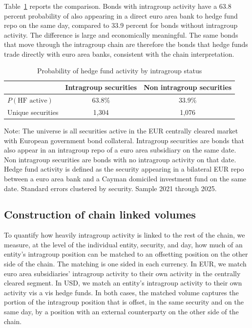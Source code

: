 \documentclass[english, 11pt, oneside, legal]{article}
\begin{document}
Table~\ref{tab:hf_link} reports the comparison. Bonds with intragroup activity have a 63.8 percent probability of also appearing in a direct euro area bank to hedge fund repo on the same day, compared to 33.9 percent for bonds without intragroup activity. The difference is large and economically meaningful. The same bonds that move through the intragroup chain are therefore the bonds that hedge funds trade directly with euro area banks, consistent with the chain interpretation.

\begin{table}[t]
    \centering
    \caption{Probability of hedge fund activity by intragroup status}
    \label{tab:hf_link}
    \begin{tabular}{lcc}
        \hline
                                    & Intragroup securities & Non intragroup securities \\
        \hline
        $P(\text{HF active})$       & 63.8\%           & 33.9\%               \\
        Unique securities                & 1{,}304          & 1{,}076              \\
        \hline
    \end{tabular}
    \begin{flushleft}
        \footnotesize Note: The universe is all securities active in the EUR centrally cleared market with European government bond collateral. Intragroup securities are bonds that also appear in an intragroup repo of a euro area subsidiary on the same date. Non intragroup securities are bonds with no intragroup activity on that date. Hedge fund activity is defined as the security appearing in a bilateral EUR repo between a euro area bank and a Cayman domiciled investment fund on the same date. Standard errors clustered by security. Sample 2021 through 2025.
    \end{flushleft}
\end{table}



\subsection{Construction of chain linked volumes}
\label{subsec:chain_construction}

To quantify how heavily intragroup activity is linked to the rest of the chain, we measure, at the level of the individual entity, security, and day, how much of an entity's intragroup position can be matched to an offsetting position on the other side of the chain. The matching is one sided in each currency. In EUR, we match euro area subsidiaries' intragroup activity to their own activity in the centrally cleared segment. In USD, we match an entity's intragroup activity to their own activity vis a vis hedge funds. In both cases, the matched volume captures the portion of the intragroup position that is offset, in the same security and on the same day, by a position with an external counterparty on the other side of the chain.
\end{document}

